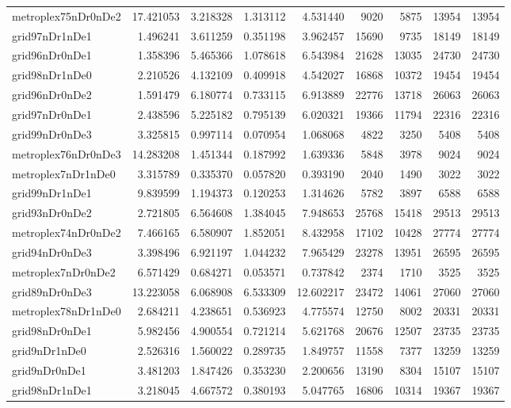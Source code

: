 \begin{longtable}{|l|r|r|r|r|r|r|r|r|}
metroplex75nDr0nDe2 & 17.421053 & 3.218328 & 1.313112 & 4.531440 & 9020 & 5875 & 13954 & 13954 \\
grid97nDr1nDe1 & 1.496241 & 3.611259 & 0.351198 & 3.962457 & 15690 & 9735 & 18149 & 18149 \\
grid96nDr0nDe1 & 1.358396 & 5.465366 & 1.078618 & 6.543984 & 21628 & 13035 & 24730 & 24730 \\
grid98nDr1nDe0 & 2.210526 & 4.132109 & 0.409918 & 4.542027 & 16868 & 10372 & 19454 & 19454 \\
grid96nDr0nDe2 & 1.591479 & 6.180774 & 0.733115 & 6.913889 & 22776 & 13718 & 26063 & 26063 \\
grid97nDr0nDe1 & 2.438596 & 5.225182 & 0.795139 & 6.020321 & 19366 & 11794 & 22316 & 22316 \\
grid99nDr0nDe3 & 3.325815 & 0.997114 & 0.070954 & 1.068068 & 4822 & 3250 & 5408 & 5408 \\
metroplex76nDr0nDe3 & 14.283208 & 1.451344 & 0.187992 & 1.639336 & 5848 & 3978 & 9024 & 9024 \\
metroplex7nDr1nDe0 & 3.315789 & 0.335370 & 0.057820 & 0.393190 & 2040 & 1490 & 3022 & 3022 \\
grid99nDr1nDe1 & 9.839599 & 1.194373 & 0.120253 & 1.314626 & 5782 & 3897 & 6588 & 6588 \\
grid93nDr0nDe2 & 2.721805 & 6.564608 & 1.384045 & 7.948653 & 25768 & 15418 & 29513 & 29513 \\
metroplex74nDr0nDe2 & 7.466165 & 6.580907 & 1.852051 & 8.432958 & 17102 & 10428 & 27774 & 27774 \\
grid94nDr0nDe3 & 3.398496 & 6.921197 & 1.044232 & 7.965429 & 23278 & 13951 & 26595 & 26595 \\
metroplex7nDr0nDe2 & 6.571429 & 0.684271 & 0.053571 & 0.737842 & 2374 & 1710 & 3525 & 3525 \\
grid89nDr0nDe3 & 13.223058 & 6.068908 & 6.533309 & 12.602217 & 23472 & 14061 & 27060 & 27060 \\
metroplex78nDr1nDe0 & 2.684211 & 4.238651 & 0.536923 & 4.775574 & 12750 & 8002 & 20331 & 20331 \\
grid98nDr0nDe1 & 5.982456 & 4.900554 & 0.721214 & 5.621768 & 20676 & 12507 & 23735 & 23735 \\
grid9nDr1nDe0 & 2.526316 & 1.560022 & 0.289735 & 1.849757 & 11558 & 7377 & 13259 & 13259 \\
grid9nDr0nDe1 & 3.481203 & 1.847426 & 0.353230 & 2.200656 & 13190 & 8304 & 15107 & 15107 \\
grid98nDr1nDe1 & 3.218045 & 4.667572 & 0.380193 & 5.047765 & 16806 & 10314 & 19367 & 19367 \\

\end{longtable}
